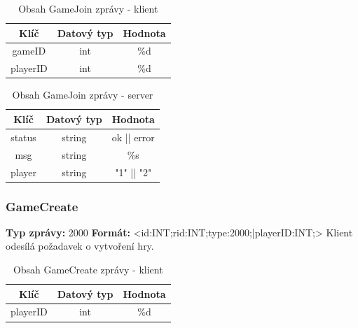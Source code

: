 \documentclass[12pt, a4paper]{article}
\begin{document}
    \begin{table}[H]
        \centering
        \begin{tabular}{|c|c|c|}
            \hline
            Klíč & Datový typ & Hodnota \\
            \hline
            \hline
            gameID & int & \%d \\
            \hline
            playerID & int & \%d \\
            \hline
        \end{tabular}
        \caption{Obsah GameJoin zprávy - klient}
    \end{table}

    \begin{table}[H]
        \centering
        \begin{tabular}{|c|c|c|}
            \hline
            Klíč & Datový typ & Hodnota \\
            \hline
            \hline
            status & string & ok || error \\
            \hline
            msg & string & \%s \\
            \hline
            player & string & "1" || "2" \\
            \hline
        \end{tabular}
        \caption{Obsah GameJoin zprávy - server}
    \end{table}

\subsubsection{GameCreate}
\textbf{Typ zprávy: } 2000 \newline
\textbf{Formát: } \newline  <id:INT;rid:INT;type:2000;|playerID:INT;> \newline
Klient odesílá požadavek o vytvoření hry. \newline

    \begin{table}[H]
        \centering
        \begin{tabular}{|c|c|c|}
            \hline
            Klíč & Datový typ & Hodnota \\
            \hline
            \hline
            playerID & int & \%d \\
            \hline
        \end{tabular}
        \caption{Obsah GameCreate zprávy - klient}
    \end{table}
\end{document}
